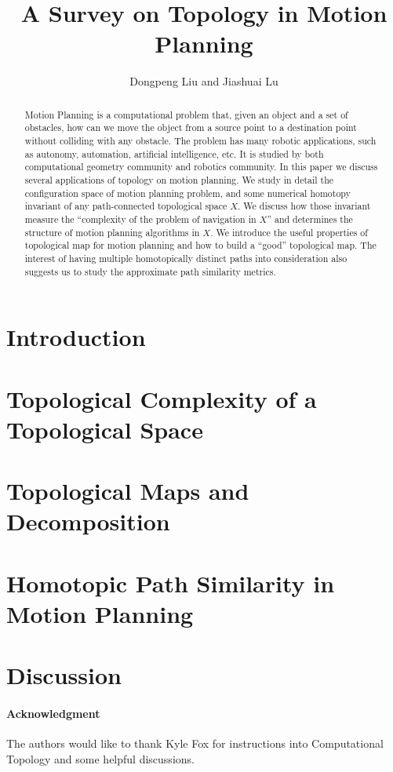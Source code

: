 \documentclass[12pt,twoside]{article}
\begin{document}
\title{A Survey on Topology in Motion Planning}

\author{
Dongpeng Liu %
and Jiashuai Lu%
}


\maketitle

%
\begin{abstract}
  Motion Planning is a computational problem that, given an object and a set of obstacles, how can we move the object from a source point to a destination point without colliding with any obstacle.
  The problem has many robotic applications, such as autonomy, automation, artificial intelligence, etc. It is studied by both computational geometry community and robotics community.
  In this paper we discuss several applications of topology on motion planning.
  We study in detail the configuration space of motion planning problem, and some numerical homotopy invariant of any path-connected topological space \(X\). We discuss how those invariant measure the ``complexity of the problem of navigation in \(X\)'' and determines the structure of motion planning algorithms in \(X\).
  We introduce the useful properties of topological map for motion planning and how to build a ``good'' topological map. The interest of having multiple homotopically distinct paths into consideration also suggests us to study the approximate path similarity metrics.
\end{abstract}

\setcounter{page}{1}

\section{Introduction}\label{sec:intro}


\section{Topological Complexity of a Topological Space}\label{sec:complexity}

\section{Topological Maps and Decomposition}\label{sec:decomposition}

\section{Homotopic Path Similarity in Motion Planning}\label{sec:sim}

\section{Discussion}\label{sec:dis}

\paragraph*{Acknowledgment} The authors would like to thank Kyle Fox for instructions into Computational Topology and some helpful discussions.



\end{document}
